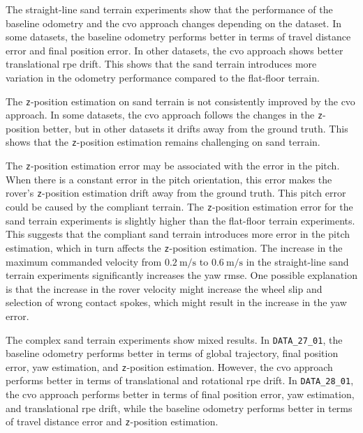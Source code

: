 \documentclass[report.tex]{subfiles}
\begin{document}
    The straight-line sand terrain experiments show that the performance of the baseline odometry and the \gls{cvo} approach changes depending on the dataset. In some datasets, the baseline odometry performs better in terms of travel distance error and final position error. In other datasets, the \gls{cvo} approach shows better translational \gls{rpe} drift. This shows that the sand terrain introduces more variation in the odometry performance compared to the flat-floor terrain.

    The \texttt{z}-position estimation on sand terrain is not consistently improved by the \gls{cvo} approach. In some datasets, the \gls{cvo} approach follows the changes in the \texttt{z}-position better, but in other datasets it drifts away from the ground truth. This shows that the \texttt{z}-position estimation remains challenging on sand terrain. 
    
    The \texttt{z}-position estimation error may be associated with the error in the pitch. When there is a constant error in the pitch orientation, this error makes the rover's \texttt{z}-position estimation drift away from the ground truth. This pitch error could be caused by the compliant terrain. The \texttt{z}-position estimation error for the sand terrain experiments is slightly higher than the flat-floor terrain experiments. This suggests that the compliant sand terrain introduces more error in the pitch estimation, which in turn affects the \texttt{z}-position estimation. The increase in the maximum commanded velocity from $0.2~\mathrm{m/s}$ to $0.6~\mathrm{m/s}$ in the straight-line sand terrain experiments significantly increases the yaw \gls{rmse}. One possible explanation is that the increase in the rover velocity might increase the wheel slip and selection of wrong contact spokes, which might result in the increase in the yaw error. 

    The complex sand terrain experiments show mixed results. In \texttt{DATA\_27\_01}, the baseline odometry performs better in terms of global trajectory, final position error, yaw estimation, and \texttt{z}-position estimation. However, the \gls{cvo} approach performs better in terms of translational and rotational \gls{rpe} drift. In \texttt{DATA\_28\_01}, the \gls{cvo} approach performs better in terms of final position error, yaw estimation, and translational \gls{rpe} drift, while the baseline odometry performs better in terms of travel distance error and \texttt{z}-position estimation.
\end{document}
